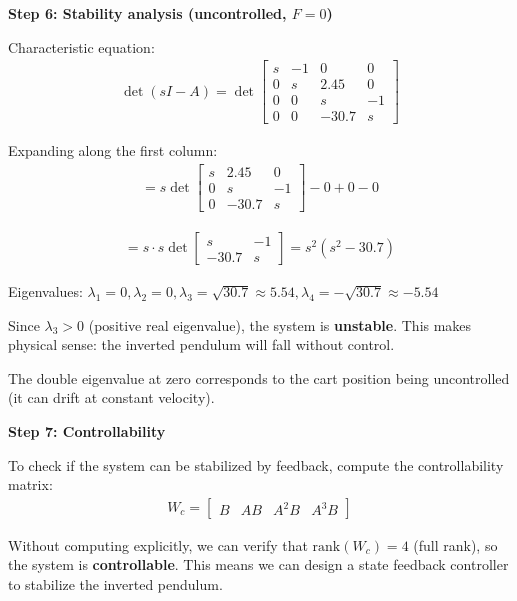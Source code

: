 \documentclass[11pt,a4paper]{article}
\begin{document}
\textbf{Step 6: Stability analysis (uncontrolled, $F = 0$)}

Characteristic equation:
\begin{align}
\det(sI - A) = \det\begin{bmatrix} s & -1 & 0 & 0 \\ 0 & s & 2.45 & 0 \\ 0 & 0 & s & -1 \\ 0 & 0 & -30.7 & s \end{bmatrix}
\end{align}

Expanding along the first column:
\begin{align}
= s \det\begin{bmatrix} s & 2.45 & 0 \\ 0 & s & -1 \\ 0 & -30.7 & s \end{bmatrix} - 0 + 0 - 0
\end{align}

\begin{align}
= s \cdot s \det\begin{bmatrix} s & -1 \\ -30.7 & s \end{bmatrix} = s^2(s^2 - 30.7)
\end{align}

Eigenvalues: $\lambda_1 = 0, \lambda_2 = 0, \lambda_3 = \sqrt{30.7} \approx 5.54, \lambda_4 = -\sqrt{30.7} \approx -5.54$

Since $\lambda_3 > 0$ (positive real eigenvalue), the system is \textbf{unstable}. This makes physical sense: the inverted pendulum will fall without control.

The double eigenvalue at zero corresponds to the cart position being uncontrolled (it can drift at constant velocity).

\textbf{Step 7: Controllability}

To check if the system can be stabilized by feedback, compute the controllability matrix:
\begin{align}
W_c = \begin{bmatrix} B & AB & A^2B & A^3B \end{bmatrix}
\end{align}

Without computing explicitly, we can verify that $\text{rank}(W_c) = 4$ (full rank), so the system is \textbf{controllable}. This means we can design a state feedback controller to stabilize the inverted pendulum.
\end{document}
